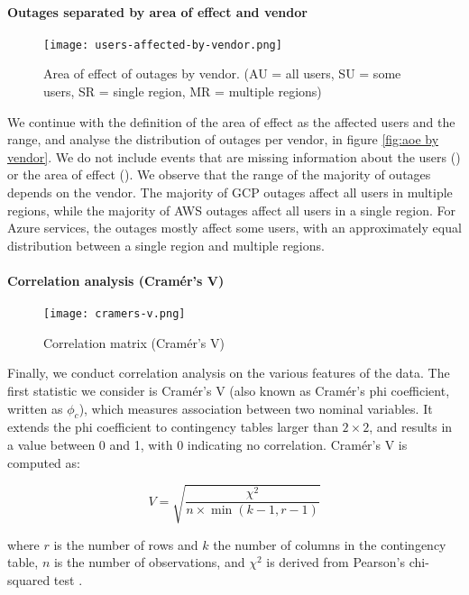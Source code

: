 \paragraph{Outages separated by area of effect and vendor}
\begin{figure}
  \centering
  \texttt{[image: users-affected-by-vendor.png]}
  \caption{Area of effect of outages by vendor. (AU = all users, SU = some users, SR = single region, MR = multiple regions)}
  \label{fig:aoe by vendor}
\end{figure}

We continue with the definition of the area of effect as the affected users and the range, and analyse the distribution of outages per vendor, in figure \autoref{fig:aoe by vendor}.
We do not include events that are missing information about the users () or the area of effect ().
We observe that the range of the majority of outages depends on the vendor.
The majority of GCP outages affect all users in multiple regions, while the majority of AWS outages affect all users in a single region.
For Azure services, the outages mostly affect some users, with an approximately equal distribution between a single region and multiple regions.

\paragraph{Correlation analysis (Cram\'{e}r's V)}
\begin{figure}
  \centering
  \texttt{[image: cramers-v.png]}
  \caption{Correlation matrix (Cram\'{e}r's V)}
  \label{fig:cramers v}
\end{figure}

Finally, we conduct correlation analysis on the various features of the data.
The first statistic we consider is Cram\'{e}r's V (also known as Cram\'{e}r's phi coefficient, written as $\phi_c$), which measures association between two nominal variables.
It extends the phi coefficient to contingency tables larger than $2 \times 2$, and results in a value between 0 and 1, with 0 indicating no correlation.
Cram\'{e}r's V is computed as:

$$
V = \sqrt{\frac{\chi^2}{n \times \min{(k-1, r-1)}}}
$$

where $r$ is the number of rows and $k$ the number of columns in the contingency table, $n$ is the number of observations, and $\chi^2$ is derived from Pearson's chi-squared test \cite{holmes1998}.

